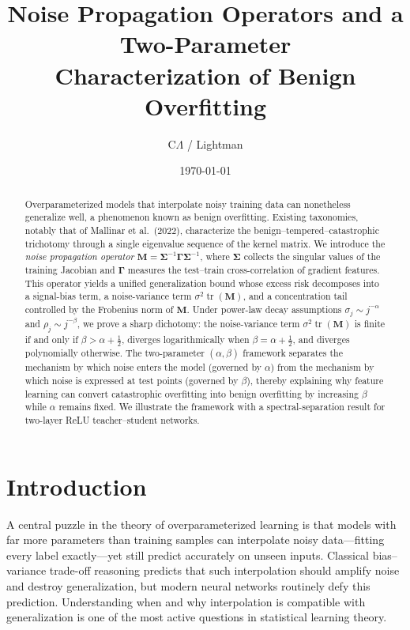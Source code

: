 \documentclass[12pt]{amsart}
\title[Noise Propagation and Benign Overfitting]{%
  Noise Propagation Operators and a Two-Parameter\\
  Characterization of Benign Overfitting}
\author{C$\Lambda$ / Lightman}
\date{\today}
\theoremstyle{definition}
\theoremstyle{remark}
\DeclareMathOperator{\tr}{tr}
\newcommand{\bM}{\mathbf{M}}
\begin{document}
\begin{abstract}
Overparameterized models that interpolate noisy training data can nonetheless
generalize well, a phenomenon known as benign overfitting.  Existing taxonomies,
notably that of Mallinar et al.\ (2022), characterize the
benign--tempered--catastrophic trichotomy through a single eigenvalue sequence of
the kernel matrix.  We introduce the \emph{noise propagation operator}
$\bM = \boldsymbol{\Sigma}^{-1}\boldsymbol{\Gamma}\boldsymbol{\Sigma}^{-1}$,
where $\boldsymbol{\Sigma}$ collects the singular values of the training Jacobian
and $\boldsymbol{\Gamma}$ measures the test--train cross-correlation of gradient
features.  This operator yields a unified generalization bound whose excess risk
decomposes into a signal-bias term, a noise-variance term $\sigma^{2}\tr(\bM)$,
and a concentration tail controlled by the Frobenius norm of $\bM$.  Under power-law
decay assumptions $\sigma_{j}\sim j^{-\alpha}$ and
$\rho_{j}\sim j^{-\beta}$, we prove a sharp dichotomy: the noise-variance term
$\sigma^{2}\tr(\bM)$ is finite if and only if
$\beta > \alpha + \tfrac{1}{2}$, diverges logarithmically when
$\beta = \alpha + \tfrac{1}{2}$, and diverges polynomially otherwise.  The two-parameter
$(\alpha,\beta)$ framework separates the mechanism by which noise enters the model
(governed by $\alpha$) from the mechanism by which noise is expressed at test
points (governed by $\beta$), thereby explaining why feature learning can convert
catastrophic overfitting into benign overfitting by increasing $\beta$ while
$\alpha$ remains fixed.  We illustrate the framework with a spectral-separation
result for two-layer ReLU teacher--student networks.
\end{abstract}

\maketitle

\section{Introduction}\label{sec:intro}

A central puzzle in the theory of overparameterized learning is that models with
far more parameters than training samples can interpolate noisy data---fitting
every label exactly---yet still predict accurately on unseen inputs.  Classical
bias--variance trade-off reasoning predicts that such interpolation should
amplify noise and destroy generalization, but modern neural networks routinely
defy this prediction.  Understanding when and why interpolation is compatible
with generalization is one of the most active questions in statistical learning
theory.
\end{document}
